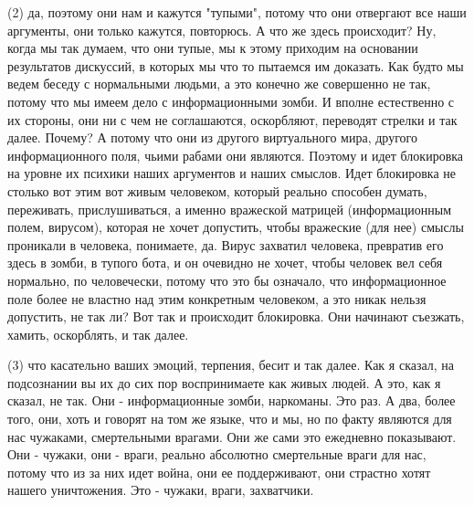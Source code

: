 (2) да, поэтому они нам и кажутся "тупыми", потому что они отвергают все наши
аргументы, они только кажутся, повторюсь. А что же здесь происходит? Ну, когда
мы так думаем, что они тупые, мы к этому приходим на основании результатов
дискуссий, в которых мы что то пытаемся им доказать. Как будто мы ведем беседу
с нормальными людьми, а это конечно же совершенно не так, потому что мы имеем
дело с информационными зомби. И вполне естественно с их стороны, они ни с чем
не соглашаются, оскорбляют, переводят стрелки и так далее. Почему? А потому что
они из другого виртуального мира, другого информационного поля, чьими рабами
они являются. Поэтому и идет блокировка на уровне их психики наших аргументов и
наших смыслов. Идет блокировка не столько вот этим вот живым человеком, который
реально способен думать, переживать, прислушиваться, а именно вражеской
матрицей (информационным полем, вирусом), которая не хочет допустить, чтобы
вражеские (для нее) смыслы проникали в человека, понимаете, да. Вирус захватил
человека, превратив его здесь в зомби, в тупого бота, и он очевидно не хочет,
чтобы человек вел себя нормально, по человечески, потому что это бы означало,
что информационное поле более не властно над этим конкретным человеком, а это
никак нельзя допустить, не так ли? Вот так и происходит блокировка. Они
начинают съезжать, хамить, оскорблять, и так далее.

(3) что касательно ваших эмоций, терпения, бесит и так далее. Как я сказал, на
подсознании вы их до сих пор воспринимаете как живых людей. А это, как я
сказал, не так. Они - информационные зомби, наркоманы. Это раз. А два, более
того, они, хоть и говорят на том же языке, что и мы, но по факту являются для
нас чужаками, смертельными врагами. Они же сами это ежедневно показывают. Они -
чужаки, они - враги, реально абсолютно смертельные враги для нас, потому что из
за них идет война, они ее поддерживают, они страстно хотят нашего уничтожения.
Это - чужаки, враги, захватчики.




